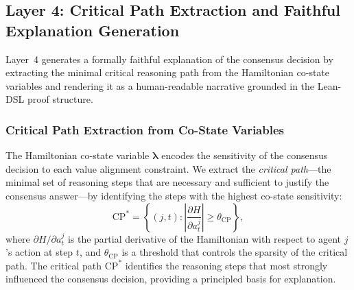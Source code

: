 \documentclass[12pt,a4paper]{article}
\newtheorem{theorem}{Theorem}[section]
\newcommand{\calA}{\mathcal{A}}
\newcommand{\bW}{\bm{W}}
\newcommand{\blambda}{\bm{\lambda}}
\begin{document}


\subsection{Layer 4: Critical Path Extraction and Faithful Explanation Generation}
\label{sec:layer4}

Layer~4 generates a formally faithful explanation of the consensus decision by
extracting the minimal critical reasoning path from the Hamiltonian co-state variables
and rendering it as a human-readable narrative grounded in the Lean-DSL proof
structure.

\subsubsection{Critical Path Extraction from Co-State Variables}

The Hamiltonian co-state variable $\blambda$ encodes the sensitivity of the consensus
decision to each value alignment constraint. We extract the \emph{critical path}---the
minimal set of reasoning steps that are necessary and sufficient to justify the
consensus answer---by identifying the steps with the highest co-state sensitivity:
\begin{equation}
  \mathrm{CP}^* = \left\{(j, t) : \left|\frac{\partial H}{\partial a^j_t}\right| \geq
  \theta_{\mathrm{CP}}\right\},
  \label{eq:critical_path}
\end{equation}
where $\partial H / \partial a^j_t$ is the partial derivative of the Hamiltonian with
respect to agent $j$'s action at step $t$, and $\theta_{\mathrm{CP}}$ is a threshold
that controls the sparsity of the critical path. The critical path $\mathrm{CP}^*$
identifies the reasoning steps that most strongly influenced the consensus decision,
providing a principled basis for explanation.
\end{document}
